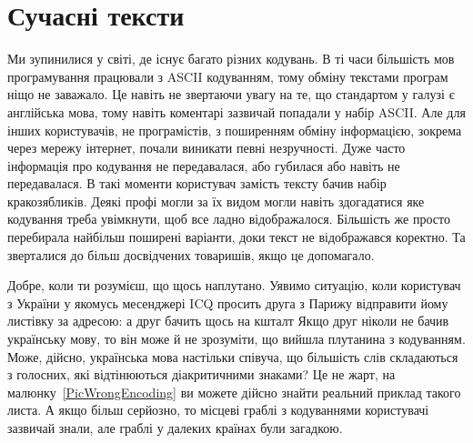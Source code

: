 \section{Сучасні тексти}

Ми зупинилися у світі, де існує багато різних кодувань.
В ті часи більшість мов програмування працювали з ASCII кодуванням, тому обміну текстами програм ніщо не заважало.
Це навіть не звертаючи увагу на те, що стандартом у галузі є англійська мова, тому навіть коментарі зазвичай попадали у набір ASCII.
Але для інших користувачів, не програмістів, з поширенням обміну інформацією, зокрема через мережу інтернет, почали виникати певні незручності.
Дуже часто інформація про кодування не передавалася, або губилася або навіть не передавалася.
В такі моменти користувач замість тексту бачив набір кракозябликів.
Деякі профі могли за їх видом могли навіть здогадатися яке кодування треба увімкнути, щоб все ладно відображалося.
Більшість же просто перебирала найбільш поширені варіанти, доки текст не відображався коректно.
Та зверталися до більш досвідчених товаришів, якщо це допомагало.

Добре, коли ти розумієш, що щось наплутано.
Уявимо ситуацію, коли користувач з України у якомусь месенджері ICQ просить друга з Парижу відправити йому листівку за адресою:
\noindent а друг бачить щось на кшталт
\noindent Якщо друг ніколи не бачив українську мову, то він може й не зрозуміти, що вийшла плутанина з кодуванням.
Може, дійсно, українська мова настільки співуча, що більшість слів складаються з голосних, які відтінюються діакритичними знаками?
Це не жарт, на малюнку~\ref{PicWrongEncoding} ви можете дійсно знайти реальний приклад такого листа.
А якщо більш серйозно, то місцеві граблі з кодуваннями користувачі зазвичай знали, але граблі у далеких країнах були загадкою.


